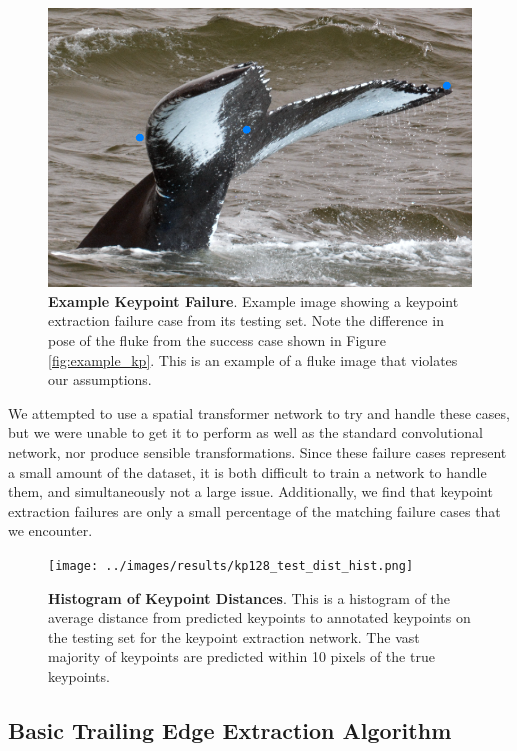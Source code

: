 \begin{figure}[t]%
\centering
\includegraphics[width=1.0\textwidth]{../images/aid1323_kpoverlay.png}
\caption{\textbf{Example Keypoint Failure}. Example image showing a keypoint extraction failure case from its testing set. Note the difference in pose of the fluke from the success case shown in Figure \ref{fig:example_kp}. This is an example of a fluke image that violates our assumptions.}
\label{fig:example_kp_failure}
\end{figure}



We attempted to use a spatial transformer network \cite{jaderberg2015spatial} to try and handle these cases, but we were unable to get it to perform as well as the standard convolutional network, nor produce sensible transformations.
Since these failure cases represent a small amount of the dataset, it is both difficult to train a network to handle them, and simultaneously not a large issue.
Additionally, we find that keypoint extraction failures are only a small percentage of the matching failure cases that we encounter.

\begin{figure}[t]%
\centering
\texttt{[image: ../images/results/kp128\_test\_dist\_hist.png]}
\caption{\textbf{Histogram of Keypoint Distances}. This is a histogram of the average distance from predicted keypoints to annotated keypoints on the testing set for the keypoint extraction network. The vast majority of keypoints are predicted within 10 pixels of the true keypoints.}
\label{fig:kp128_dist_hist}
\end{figure}



\subsection{Basic Trailing Edge Extraction Algorithm}


